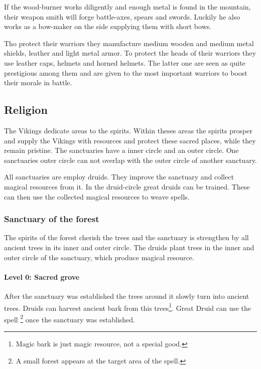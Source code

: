 \documentclass[a4paper]{book}
\begin{document}
	If the wood-burner works diligently and enough metal is found in the mountain,
	their weapon smith will forge battle-axes, spears and swords.
	Luckily he also works as a bow-maker on the side supplying them with short bows.

	Tho protect their warriors they manufacture medium wooden and medium metal shields,
	leather and light metal armor.
	To protect the heads of their warriors they use leather caps, helmets and horned helmets.
	The latter one are seen as quite prestigious among them and are given to the most important
	warriors to boost their morale in battle.

	\subsection{Religion}
		The \gls{Vikings} dedicate areas to the spirits.
		Within theses areas the spirits prosper and supply the \gls{Vikings}
		with resources and protect these sacred places,
		while they remain pristine.
		The sanctuaries have a inner circle and an outer circle.
		One sanctuaries outer circle can not overlap with the outer circle of another sanctuary.

		All sanctuaries are employ druids.
		They improve the sanctuary and collect magical resources from it.
		In the druid-circle great druids can be trained.
		These can then use the collected magical resources to weave spells.

		\subsubsection{Sanctuary of the forest}
			The spirits of the forest cherish the trees and the sanctuary is strengthen by
			all ancient trees in its inner and outer circle.
			The druids plant trees in the inner and outer circle of the sanctuary,
			which produce magical resource.

			\paragraph{Level 0: Sacred grove}
				After the sanctuary was established the trees around it slowly turn into ancient trees.
				Druids can harvest ancient bark from this trees\footnote{
					Magic bark is just magic resource, not a special good.
				}.
				Great Druid can use the spell \footnote{
					A small forest appears at the target area of the spell.
				} once the sanctuary was established.
\end{document}
